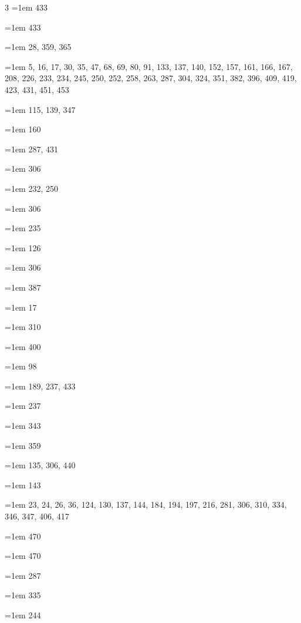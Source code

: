 \begin{multicols}{3}
\hangindent=1em  433\par
\hangindent=1em  433\par
\hangindent=1em  28, 359, 365\par
\hangindent=1em  5, 16, 17, 30, 35, 47, 68, 69, 80, 91, 133, 137, 140, 152, 157, 161, 166, 167, 208, 226, 233, 234, 245, 250, 252, 258, 263, 287, 304, 324, 351, 382, 396, 409, 419, 423, 431, 451, 453\par
\hangindent=1em  115, 139, 347\par
\hangindent=1em  160\par
\hangindent=1em  287, 431\par
\hangindent=1em  306\par
\hangindent=1em  232, 250\par
\hangindent=1em  306\par
\hangindent=1em  235\par
\hangindent=1em  126\par
\hangindent=1em  306\par
\hangindent=1em  387\par
\hangindent=1em  17\par
\hangindent=1em  310\par
\hangindent=1em  400\par
\hangindent=1em  98\par
\hangindent=1em  189, 237, 433\par
\hangindent=1em  237\par
\hangindent=1em  343\par
\hangindent=1em  359\par
\hangindent=1em  135, 306, 440\par
\hangindent=1em  143\par
\hangindent=1em  23, 24, 26, 36, 124, 130, 137, 144, 184, 194, 197, 216, 281, 306, 310, 334, 346, 347, 406, 417\par
\hangindent=1em  470\par
\hangindent=1em  470\par
\hangindent=1em  287\par
\hangindent=1em  335\par
\hangindent=1em  244\par

\end{multicols}
